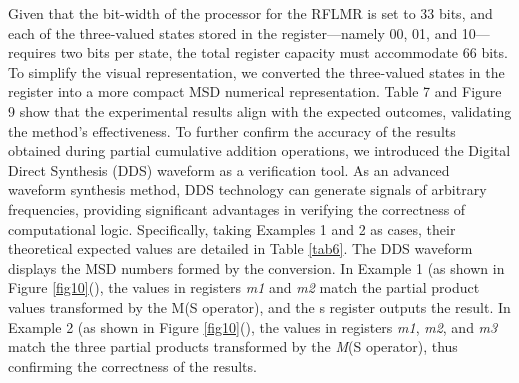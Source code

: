 \documentclass[electronics,article,accept,pdftex,moreauthors]{Definitions/mdpi}
\begin{document}
Given that the bit-width of the processor for the RFLMR is set to 33 bits, and each of the three-valued states stored in the register—namely 00, 01, and 10—requires two bits per state, the total register capacity must accommodate 66 bits. To simplify the visual representation, we converted the three-valued states in the register into a more compact MSD numerical representation. Table 7 and Figure 9 show that the experimental results align with the expected outcomes, validating the method’s effectiveness.
To further confirm the accuracy of the results obtained during partial cumulative addition operations, we introduced the Digital Direct Synthesis (DDS) waveform as a verification tool. As an advanced waveform synthesis method, DDS technology can generate signals of arbitrary frequencies, providing significant advantages in verifying the correctness of computational logic. Specifically, taking Examples 1 and 2 as cases, their theoretical expected values are detailed in Table \ref{tab6}. The DDS waveform displays the MSD numbers formed by the conversion. In Example 1 (as shown in Figure \ref{fig10}(), the values in registers \textit{m1} and \textit{m2} match the partial product values transformed by the M(S operator), and the s register outputs the result. In Example 2 (as shown in Figure \ref{fig10}(), the values in registers \textit{m1},\textit{ m2}, and \textit{m3} match the three partial products transformed by the \textit{M}(S operator), thus confirming the correctness of the results.
\end{document}
